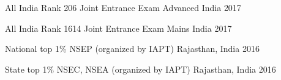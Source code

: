 \begin{cvhonors}
  \cvhonor
  {All India Rank 206}
  {Joint Entrance Exam Advanced}
  {India}
  {2017}

  \cvhonor
  {All India Rank 1614}
  {Joint Entrance Exam Mains}
  {India}
  {2017}


  \cvhonor
  {National top 1\%}
  {NSEP (organized by IAPT)}
  {Rajasthan, India}
  {2016}
  
  \cvhonor
  {State top 1\%}
  {NSEC, NSEA (organized by IAPT)}
  {Rajasthan, India}
  {2016}
  
\end{cvhonors}

